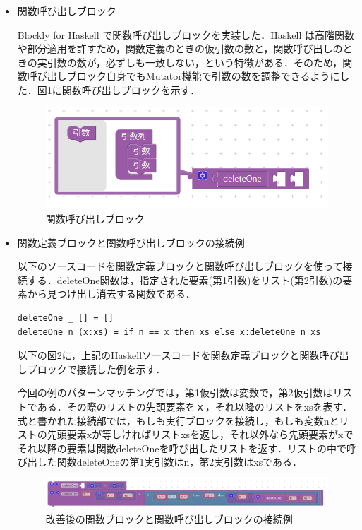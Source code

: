 \documentclass{risepaper}
\begin{document}
\begin{itemize}
\item 関数呼び出しブロック

Blockly for Haskell で関数呼び出しブロックを実装した．Haskell は高階関数や部分適用を許すため，関数定義のときの仮引数の数と，関数呼び出しのときの実引数の数が，必ずしも一致しない，という特徴がある．そのため，関数呼び出しブロック自身でもMutator機能で引数の数を調整できるようにした．図\ref{fig:haskell_function_call_new}に関数呼び出しブロックを示す．

\begin{figure}[h]
\begin{center}
\includegraphics[scale=0.5]{img/haskell_function_call_new.PNG}
\caption{関数呼び出しブロック}%
\label{fig:haskell_function_call_new}
\end{center}%
\end{figure}%

\item 関数定義ブロックと関数呼び出しブロックの接続例

以下のソースコードを関数定義ブロックと関数呼び出しブロックを使って接続する．deleteOne関数は，指定された要素(第1引数)をリスト(第2引数)の要素から見つけ出し消去する関数である．
\begin{lstlisting}[basicstyle=\ttfamily\footnotesize]
deleteOne _ [] = []
deleteOne n (x:xs) = if n == x then xs else x:deleteOne n xs
\end{lstlisting}

以下の図\ref{fig:haskell_function_example}に，上記のHaskellソースコードを関数定義ブロックと関数呼び出しブロックで接続した例を示す．

今回の例のパターンマッチングでは，第1仮引数は変数で，第2仮引数はリストである．その際のリストの先頭要素をｘ，それ以降のリストをxsを表す．式と書かれた接続部では，もしも実行ブロックを接続し，もしも変数nとリストの先頭要素xが等しければリストxsを返し，それ以外なら先頭要素がxでそれ以降の要素は関数deleteOneを呼び出したリストを返す．リストの中で呼び出した関数deleteOneの第1実引数はn，第2実引数はxsである．

\begin{figure}[h]
\begin{center}
\includegraphics[scale=0.5]{img/haskell_function_example.PNG}
\caption{改善後の関数ブロックと関数呼び出しブロックの接続例}%
\label{fig:haskell_function_example}
\end{center}%
\end{figure}%


\end{itemize}
\end{document}
